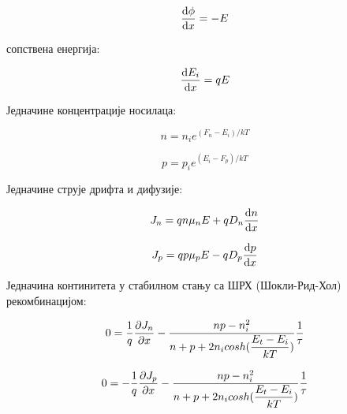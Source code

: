 \documentclass{article}
\begin{document}
\begin{equation*} %
	\dv{\phi}{x} = - E
\end{equation*}

сопствена енергија:

\begin{equation*} 
	\dv{E_i}{x} = q E
\end{equation*}

Једначине концентрације носилаца:

\begin{equation*} 
	n = n_i e^{(F_n - E_i)/kT}
\end{equation*}

\begin{equation*} 
	p = p_i e^{(E_i - F_p)/kT}
\end{equation*}

Једначине струје дрифта и дифузије:

\begin{equation*} 
	J_n = q n \mu_n E + q D_n \dv{n}{x} 
\end{equation*}

\begin{equation*} 
	J_p = q p \mu_p E - q D_p \dv{p}{x} 
\end{equation*}

Једначина континитета у стабилном стању са ШРХ (Шокли-Рид-Хол) рекомбинацијом:

\begin{equation*} 
	0 = \dfrac{1}{q} \pdv{J_n}{x} - \dfrac{np - n_i^2}{n + p + 2n_i cosh(\dfrac{E_t - E_i}{kT})} \dfrac{1}{\tau}
\end{equation*}
 
\begin{equation*} 
	0 = -\dfrac{1}{q} \pdv{J_p}{x} - \dfrac{np - n_i^2}{n + p + 2n_i cosh(\dfrac{E_t - E_i}{kT})} \dfrac{1}{\tau}
\end{equation*}


\end{document}
